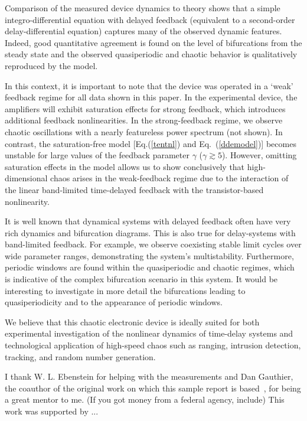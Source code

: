 \documentclass[aps,twocolumn,pre,nofootinbib]{revtex4}
\begin{document}
Comparison of the measured device dynamics to theory shows that a simple integro-differential equation with delayed feedback (equivalent to a second-order delay-differential equation) captures many of the observed dynamic features. Indeed, good quantitative agreement is found on the level of bifurcations from the steady state and the observed quasiperiodic and chaotic behavior is qualitatively reproduced by the model.

In this context, it is important to note that the device was operated in a `weak' feedback regime for all data shown in this paper.  In the experimental device, the amplifiers will exhibit saturation effects for strong feedback, which introduces additional feedback nonlinearities. In the strong-feedback regime, we observe chaotic oscillations with a nearly featureless power spectrum (not shown). In contrast, the saturation-free model [Eq.(\ref{tentnl}) and Eq.~(\ref{ddemodel})] becomes unstable for large values of the feedback parameter $\gamma$ ($\gamma \gtrsim 5$).  However, omitting saturation effects in the model allows us to show conclusively that high-dimensional chaos arises in the weak-feedback regime due to the interaction of  the linear band-limited time-delayed feedback with the transistor-based nonlinearity.

It is well known that dynamical systems with delayed feedback often have very rich dynamics and bifurcation diagrams. This is also true for delay-systems with band-limited feedback. For example, we observe coexisting stable limit cycles over wide parameter ranges, demonstrating the system's multistability. Furthermore, periodic windows are found within the quasiperiodic and chaotic regimes, which is indicative of the complex bifurcation scenario in this system. It would be interesting to investigate in more detail the bifurcations leading to quasiperiodicity and to the appearance of periodic windows.

We believe that this chaotic electronic device is ideally suited for both experimental investigation of the nonlinear dynamics of time-delay systems and technological application of high-speed chaos such as ranging, intrusion detection, tracking, and random number generation. 



\begin{acknowledgments}
I thank W. L. Ebenstein for helping with the measurements and Dan Gauthier, the coauthor of the original work on which this sample report is based~\cite{illing2006},  for being a great mentor to me. (If you got money from a federal agency, include) This work was supported by ...
\end{acknowledgments}
\end{document}
